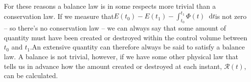 \documentclass[a4paper,12pt,%
onecolumn,oneside,%
british%
]{memoir}
\newcommand*{\di}{\mathop{}\!\mathrm{d}}%
\renewcommand*{\|}[1][]{\nonscript\:#1\vert\nonscript\:\mathopen{}}
\newcommand*{\yti}{t_{0}}
\newcommand*{\ytf}{t_{1}}
\newcommand*{\dt}{\di t}
\newcommand*{\yE}{E}
\newcommand*{\yH}{\varPhi}%
\newcommand*{\yR}{\mathcal{R}}%
\begin{document}
%
%
For these reasons a balance law is in some respects more trivial than a conservation law. If we measure that\enskip$\yE(\yti) - \yE(\ytf) - \int_{\yti}^{\ytf}\!\yH(t)\dt$\enskip is not zero -- so there's no conservation law -- we can always say that some amount of quantity must have been created or destroyed within the control volume between $\yti$ and $\ytf$.\enskip An extensive quantity can therefore always be said to satisfy a balance law. A balance is not trivial, however, if we have some other physical law that tells us in advance how the amount created or destroyed at each instant, $\yR(t)$, can be calculated.
\end{document}
